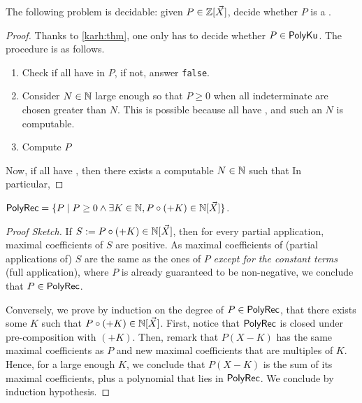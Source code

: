 \documentclass[sigconf,natbib=false,screen, review,anonymous]{acmart}
\begin{document}
\begin{corollary}
    The following problem is decidable: given $P \in \mathbb{Z}[\vec{X}]$,
    decide whether $P$ is a .
\end{corollary}
\begin{proof}
    Thanks to \cref{karh:thm}, one only has to decide whether
    $P \in \mathsf{PolyKu}$. The procedure is as follows.
    \begin{enumerate}
        \item Check if all  have
             in $P$, if not, answer \texttt{false}.
        \item Consider $N \in \mathbb{N}$ large enough so that
              $P \geq 0$ when all indeterminate are chosen greater
              than $N$. This is possible because all  have , and such an $N$
              is computable.
        \item Compute $P$
    \end{enumerate}

    Now, if all 
    have , then there exists a computable
    $N \in \mathbb{N}$ such that 
    In particular, 


\end{proof}


\begin{conjecture}
    $\mathsf{PolyRec} = \mathopen{\{} P \mid  P \geq 0 \wedge \exists K \in \mathbb{N}, P \circ (+K) \in \mathbb{N}[\vec{X}] \mathclose{\}}$.
\end{conjecture}
\begin{proof}[Proof Sketch]
    If $S \mathrel{:=} P \circ (+K) \in \mathbb{N}[\vec{X}]$, then for every partial application,
    maximal coefficients of $S$ are positive. As maximal coefficients of 
    (partial applications of) $S$ are the same as the ones of $P$
    \emph{except for the constant terms} (full application),
    where $P$ is already guaranteed to be non-negative, we conclude
    that $P \in \mathsf{PolyRec}$.

    Conversely, we prove by induction on the degree of $P \in \mathsf{PolyRec}$,
    that there exists some $K$ such that $P \circ (+K) \in \mathbb{N}[\vec{X}]$.
    First, notice that $\mathsf{PolyRec}$ is closed under pre-composition with
    $(+K)$. Then, remark that $P(X - K)$ has the same maximal coefficients as
    $P$ and new maximal coefficients that are multiples of $K$. Hence, for a
    large enough $K$, we conclude that $P(X - K)$ is the sum of its maximal
    coefficients, plus a polynomial that lies in $\mathsf{PolyRec}$. We conclude by
    induction hypothesis. 
\end{proof}
\end{document}
